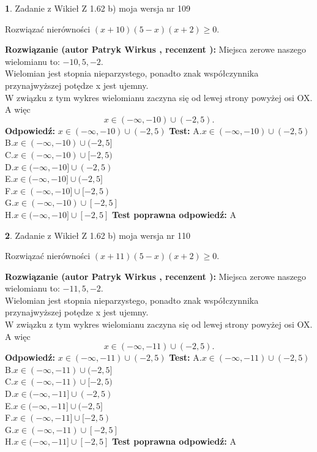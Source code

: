 \documentclass[12pt, a4paper]{article}
\theoremstyle{definition} %
\newtheorem{zad}{}
\newcommand{\zadStart}[1]{\begin{zad}#1\newline}
\newcommand{\zadStop}{\end{zad}}
\newcommand{\rozwStart}[2]{\noindent \textbf{Rozwiązanie (autor #1 , recenzent #2): }\newline}
\newcommand{\rozwStop}{\newline}
\newcommand{\odpStart}{\noindent \textbf{Odpowiedź:}\newline}
\newcommand{\odpStop}{\newline}
\newcommand{\testStart}{\noindent \textbf{Test:}\newline}
\newcommand{\testStop}{\newline}
\newcommand{\kluczStart}{\noindent \textbf{Test poprawna odpowiedź:}\newline}
\newcommand{\kluczStop}{\newline}
\begin{document}
\zadStart{Zadanie z Wikieł Z 1.62 b) moja wersja nr 109}

Rozwiązać nierówności $(x+10)(5-x)(x+2)\ge0$.
\zadStop
\rozwStart{Patryk Wirkus}{}
Miejsca zerowe naszego wielomianu to: $-10, 5, -2$.\\
Wielomian jest stopnia nieparzystego, ponadto znak współczynnika przy\linebreak najwyższej potędze x jest ujemny.\\ W związku z tym wykres wielomianu zaczyna się od lewej strony powyżej osi OX. A więc $$x \in (-\infty,-10) \cup (-2,5).$$
\rozwStop
\odpStart
$x \in (-\infty,-10) \cup (-2,5)$
\odpStop
\testStart
A.$x \in (-\infty,-10) \cup (-2,5)$\\
B.$x \in (-\infty,-10) \cup (-2,5]$\\
C.$x \in (-\infty,-10) \cup [-2,5)$\\
D.$x \in (-\infty,-10] \cup (-2,5)$\\
E.$x \in (-\infty,-10] \cup (-2,5]$\\
F.$x \in (-\infty,-10] \cup [-2,5)$\\
G.$x \in (-\infty,-10) \cup [-2,5]$\\
H.$x \in (-\infty,-10] \cup [-2,5]$
\testStop
\kluczStart
A
\kluczStop



\zadStart{Zadanie z Wikieł Z 1.62 b) moja wersja nr 110}

Rozwiązać nierówności $(x+11)(5-x)(x+2)\ge0$.
\zadStop
\rozwStart{Patryk Wirkus}{}
Miejsca zerowe naszego wielomianu to: $-11, 5, -2$.\\
Wielomian jest stopnia nieparzystego, ponadto znak współczynnika przy\linebreak najwyższej potędze x jest ujemny.\\ W związku z tym wykres wielomianu zaczyna się od lewej strony powyżej osi OX. A więc $$x \in (-\infty,-11) \cup (-2,5).$$
\rozwStop
\odpStart
$x \in (-\infty,-11) \cup (-2,5)$
\odpStop
\testStart
A.$x \in (-\infty,-11) \cup (-2,5)$\\
B.$x \in (-\infty,-11) \cup (-2,5]$\\
C.$x \in (-\infty,-11) \cup [-2,5)$\\
D.$x \in (-\infty,-11] \cup (-2,5)$\\
E.$x \in (-\infty,-11] \cup (-2,5]$\\
F.$x \in (-\infty,-11] \cup [-2,5)$\\
G.$x \in (-\infty,-11) \cup [-2,5]$\\
H.$x \in (-\infty,-11] \cup [-2,5]$
\testStop
\kluczStart
A
\kluczStop
\end{document}
